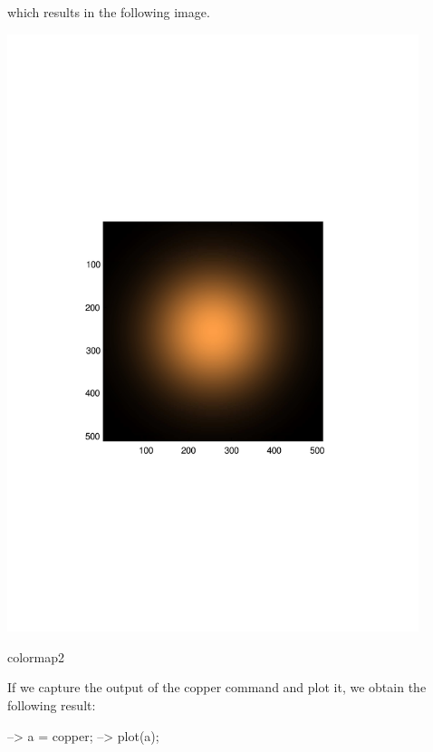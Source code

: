 which results in the following image.  
\begin{DoxyImage}
\includegraphics[width=12cm]{colormap2}
\caption{colormap2}
\end{DoxyImage}


If we capture the output of the {\ttfamily copper} command and plot it, we obtain the following result\-:


\begin{DoxyVerbInclude}
--> a = copper;
--> plot(a);
\end{DoxyVerbInclude}


